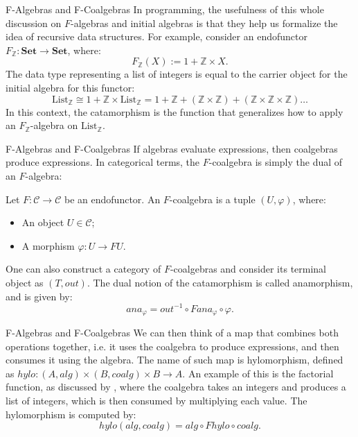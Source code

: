 \documentclass[aspectratio=169,xcolor=dvipsnames,10pt]{beamer}
\theoremstyle{definition}
\begin{document}
\begin{frame}[fragile]{F-Algebras and F-Coalgebras}
    In programming, the usefulness of this whole discussion on $F$-algebras and initial
    algebras is that they help us formalize the idea of recursive data structures.
    For example, consider an endofunctor $F_\mathbb Z:\mathbf{Set}\to\mathbf{Set}$, where:
    \begin{displaymath}
        F_\mathbb Z(X) := 1 + \mathbb Z \times X.
    \end{displaymath}
    The data type representing a list of integers is equal to the
    carrier object for the initial algebra for this functor:
    \begin{displaymath}
        \text{List}_\mathbb Z \cong 1 + \mathbb Z \times \text{List}_\mathbb Z
            = 1 + \mathbb Z + (\mathbb Z \times \mathbb Z) + (\mathbb Z \times \mathbb Z \times \mathbb Z) \dots
    \end{displaymath}
    In this context, the catamorphism is the function that generalizes how to
    apply an $F_\mathbb Z$-algebra on $\text{List}_\mathbb Z$.
\end{frame}
\begin{frame}[fragile]{F-Algebras and F-Coalgebras}
    If algebras evaluate expressions, then coalgebras produce expressions.
    In categorical terms, the $F$-coalgebra is simply the dual of an $F$-algebra:
    \begin{definition}[$F$-coalgebra]
        Let $F:\mathcal C \to \mathcal C$ be an endofunctor. An $F$-coalgebra is a tuple $(U,\varphi)$, where:
        \begin{itemize}
            \item An object $U \in \mathcal C$;
            \item A morphism $\varphi : U \to FU$.
        \end{itemize}
    \end{definition}

    One can also construct a category of $F$-coalgebras and consider its terminal
    object as $(T, out)$. The dual notion of the catamorphism is called
    anamorphism, and is given by:
    \begin{displaymath}
        ana_\varphi = out^{-1} \circ F ana_\varphi \circ \varphi.
    \end{displaymath}
\end{frame}

\begin{frame}[fragile]{F-Algebras and F-Coalgebras}
    We can then think of a map that combines both operations together, i.e. it uses
    the coalgebra to produce expressions, and then consumes it using the algebra.
    The name of such map is hylomorphism, defined as $hylo:(A,alg)\times (B,coalg) \times B \to A$.
    An example of this is the factorial function, as discussed by \citet{slodivcak2011some},
    where the coalgebra takes an integers and produces a list of integers, which is then
    consumed by multiplying each value.
    The hylomorphism is computed by:
    \begin{displaymath}
        hylo(alg,coalg) = alg \circ F hylo \circ coalg.
    \end{displaymath}
\end{frame}
\end{document}
